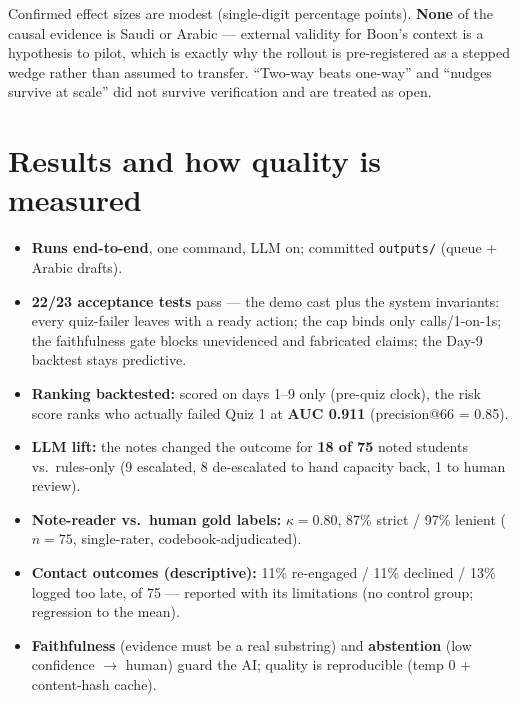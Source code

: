 \documentclass[11pt,paper=a4,parskip=half,DIV=11]{scrartcl}
\begin{document}
\begin{caveat}
Confirmed effect sizes are modest (single-digit percentage points). \textbf{None} of the causal
evidence is Saudi or Arabic --- external validity for Boon's context is a hypothesis to pilot, which is
exactly why the rollout is pre-registered as a stepped wedge rather than assumed to transfer. ``Two-way beats one-way'' and ``nudges survive at scale'' did not
survive verification and are treated as open.
\end{caveat}

\section{Results and how quality is measured}
\begin{itemize}
\item \textbf{Runs end-to-end}, one command, LLM on; committed \texttt{outputs/} (queue + Arabic drafts).
\item \textbf{22/23 acceptance tests} pass --- the demo cast plus the system invariants: every
quiz-failer leaves with a ready action; the cap binds only calls/1-on-1s; the faithfulness gate blocks
unevidenced and fabricated claims; the Day-9 backtest stays predictive.
\item \textbf{Ranking backtested:} scored on days 1--9 only (pre-quiz clock), the risk score ranks who
actually failed Quiz 1 at \textbf{AUC 0.911} (precision@66 = 0.85).
\item \textbf{LLM lift:} the notes changed the outcome for \textbf{18 of 75} noted students vs.\
rules-only (9 escalated, 8 de-escalated to hand capacity back, 1 to human review).
\item \textbf{Note-reader vs.\ human gold labels:} \(\kappa=0.80\), 87\% strict / 97\% lenient
(\(n=75\), single-rater, codebook-adjudicated).
\item \textbf{Contact outcomes (descriptive):} 11\% re-engaged / 11\% declined / 13\% logged too late,
of 75 --- reported with its limitations (no control group; regression to the mean).
\item \textbf{Faithfulness} (evidence must be a real substring) and \textbf{abstention} (low confidence
$\rightarrow$ human) guard the AI; quality is reproducible (temp 0 + content-hash cache).
\end{itemize}
\end{document}
